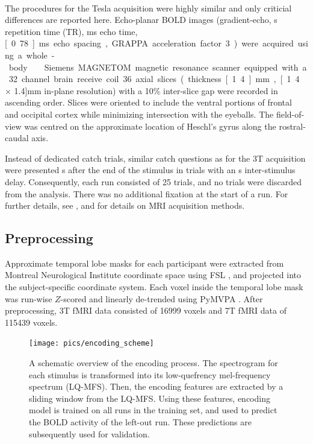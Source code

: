 \paragraph{\sevenT}
%
The procedures for the \unit[7]{Tesla} acquisition were highly similar and only
criticial differences are reported here. Echo-planar BOLD images (gradient-echo, \unit[2]{s} repetition time (TR), \unit[22]{ms} echo time, \unit[0.78]{ms} echo spacing, GRAPPA acceleration factor 3) were acquired using a whole-body \sevenT\ Siemens MAGNETOM magnetic resonance scanner equipped with a 32 channel brain receive coil. 36 axial slices (thickness \unit[1.4]{mm}, \unit[1.4 $\times$ 1.4]{mm} in-plane resolution) with a 10\% inter-slice gap were recorded in ascending order.  Slices were oriented to include the ventral portions of frontal and occipital cortex while minimizing intersection with the eyeballs. The field-of-view was centred on the approximate location of Heschl's gyrus along the rostral-caudal axis.

Instead of dedicated catch trials, similar catch questions as for the 3T acquisition were presented \unit[4]{s} after the end of the stimulus in trials with an \unit[8]{s} inter-stimulus delay. Consequently, each run consisted of 25 trials, and no trials were discarded from the analysis.  There was no additional fixation at the start of a run. For further details, see \citet{HDH+2015}, and \citet{HBI+14} for details on MRI acquisition methods.

\subsection*{Preprocessing}

Approximate temporal lobe masks for each participant were extracted from Montreal Neurological Institute coordinate space using FSL \citep{SJB+04,JBB+12}, and projected into the subject-specific coordinate system.  Each voxel inside the temporal lobe mask was run-wise $Z$-scored and linearly de-trended using PyMVPA \citep{HHS09b}. After preprocessing, 3T f{MRI} data consisted of 16999 voxels and 7T f{MRI} data of 115439 voxels.

\begin{figure}
  \centering
  \texttt{[image: pics/encoding\_scheme]}

  \caption{A schematic overview of the encoding process. The spectrogram for
    each stimulus is transformed into its low-quefrency mel-frequency spectrum
    (LQ-MFS). Then, the encoding features are extracted by a sliding window
    from the LQ-MFS. Using these features, encoding model is trained on all
    runs in the training set, and used to predict the BOLD activity of the
  left-out run.  These predictions are subsequently used for validation.}

 \label{fig:encoding_scheme}
\end{figure}


